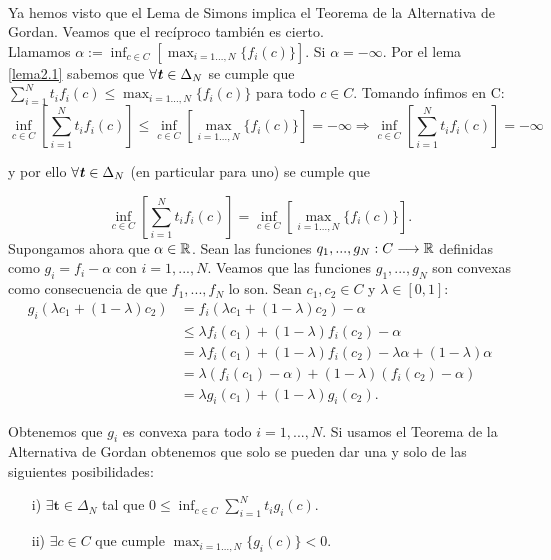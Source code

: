 	\paragraph{} Ya hemos visto que el Lema de Simons implica el Teorema de la Alternativa de Gordan. Veamos que el recíproco también es cierto.  \\
	
	Llamamos $ \alpha := \inf_{ c\in C}\left[\max_{i=1\dots,N } \{f_i(c)\} \right] $. Si $ \alpha = -\infty $. Por el lema \ref{lema2.1} sabemos que $ \forall \textbf{\emph{t}} \in \Delta_N $ se cumple que $ \sum_{i=1}^{N} t_i f_i(c) \leq \max_{i=1\dots,N } \{f_i(c)\}$ para todo $ c \in C$. Tomando ínfimos en C:
	\[
	\inf_{c \in C}\left[ \sum_{i=1}^{N} t_i f_i(c) \right] \leq \inf_{ c\in C}\left[\max_{i=1\dots,N } \{f_i(c)\} \right] = -\infty \Longrightarrow \inf_{ c \in C}\left[ \sum_{i=1}^{N} t_i f_i (c)\right] = -\infty 
	\]
	
	y por ello $ \forall \textbf{\emph{t}} \in \Delta_N $ (en particular para uno) se cumple que
	
	\[
	\inf_{c \in C}\left[ \sum_{i=1}^{N} t_i f_i (c) \right] = \inf_{ c\in C}\left[\max_{i=1\dots,N } \{f_i(c)\} \right]. \]
	Supongamos ahora que $ \alpha \in \mathbb{R} $. Sean las funciones $ q_1, ..., g_N: C \longrightarrow \mathbb{R} $ definidas como $ g_i = f_i - \alpha $ con $ i=1,...,N$. Veamos que las funciones $ g_1, ..., g_N $ son convexas como consecuencia de que $ f_1, ..., f_N $ lo son. Sean $ c_1,c_2 \in C $ y $ \lambda \in \left[0,1\right] $:
	\begin{equation*}
	\begin{split}
	g_i(\lambda c_1 + (1-\lambda) c_2) &= f_i(\lambda c_1 + (1-\lambda) c_2) - \alpha \\
	&\leq \lambda f_i(c_1) + (1-\lambda)f_i(c_2) - \alpha \\
	&= \lambda f_i(c_1) + (1-\lambda)f_i(c_2) - \lambda \alpha + (1-\lambda)\alpha \\
	&= \lambda( f_i(c_1) - \alpha ) + (1-\lambda) (f_i (c_2) - \alpha) \\
	&= \lambda g_i(c_1) + (1-\lambda) g_i (c_2).
	\end{split}
	\end{equation*}
	
	Obtenemos que $ g_i $ es convexa para todo $ i = 1, ..., N $. Si usamos el Teorema de la Alternativa de Gordan obtenemos que solo se pueden dar una y solo de las siguientes posibilidades:
	
	\begin{itemize}
		\item[i)] $ \exists \mathbf{t} \in \Delta_N $ tal que $ 0 \leq \inf_{c \in C}  \sum_{i=1}^{N}{t_i g_i (c)}$.
		\item[ii)] $ \exists c \in C $ que cumple $ \max_{i=1\dots,N } \{g_i(c)\}  < 0 $.
	\end{itemize}
	
